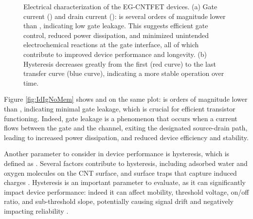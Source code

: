 \begin{figure}
    \centering
    \quad
    \caption{Electrical characterization of the EG-CNTFET devices. 
    (a) Gate current (\igs{}) and drain current (\ids{}): \igs{} is several orders of magnitude lower than \ids{}, indicating low gate leakage. This suggests efficient gate control, reduced power dissipation, and minimized unintended electrochemical reactions at the gate interface, all of which contribute to improved device performance and longevity. 
    (b) Hysteresis decreases greatly from the first (red curve) to the last transfer curve (blue curve), indicating a more stable operation over time.}
    \label{fig:parameters_noMem}
\end{figure}

Figure \ref{fig:IdIgNoMem} shows \ids{} and \igs{} on the same plot: \igs{} is orders of magnitude lower than \ids{}, indicating minimal gate leakage, which is crucial for efficient transistor functioning. Indeed, gate leakage is a phenomenon that occurs when a current flows between the gate and the channel, exiting the designated source-drain path, leading to increased power dissipation, and reduced device efficiency and stability.

Another parameter to consider in device performance is hysteresis, which is defined as  \citep{joshiUnderstanding2018}. Several factors contribute to hysteresis, including adsorbed water and oxygen molecules on the CNT surface, and surface traps that capture induced charges \citep{joshiUnderstanding2018,zaumseilSemiconducting2019}. Hysteresis is an important parameter to evaluate, as it can significantly impact device performance: indeed it can affect mobility, threshold voltage, on/off ratio, and sub-threshold slope, potentially causing signal drift and negatively impacting reliability \citep{joshiUnderstanding2018,noyceElectronic2019}.

